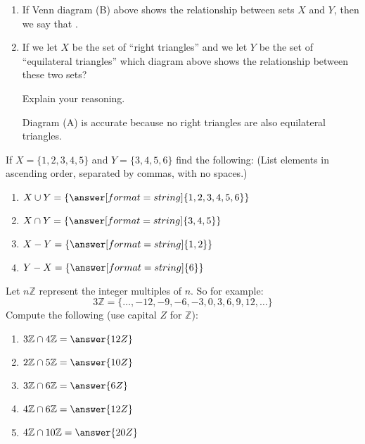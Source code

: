 \documentclass[nooutcomes]{ximera}
\begin{document}
\begin{problem}
\begin{enumerate}
\item If Venn diagram (B) above shows the relationship between sets $X$ and $Y$, then we say that .

\item If we let $X$ be the set of ``right triangles'' and we let $Y$ be the set of ``equilateral triangles'' which diagram above shows the relationship between these two sets?
\begin{multipleChoice}
\end{multipleChoice}

Explain your reasoning.
\begin{freeResponse}
\begin{hint}
Diagram (A) is accurate because no right triangles are also equilateral triangles.  
\end{hint}
\end{freeResponse}
\end{enumerate}
\end{problem}


\begin{problem}
If $X = \{1,2,3,4,5\}$ and $Y = \{3,4,5,6\}$ find the following: (List elements in ascending order, separated by commas, with no spaces.)
\begin{enumerate}
\item $X\cup Y = \{\answer[format=string]{1,2,3,4,5,6}\}$
\item $X\cap Y = \{\answer[format=string]{3,4,5}\}$
\item $X-Y = \{\answer[format=string]{1,2}\}$
\item $Y-X = \{\answer[format=string]{6}\}$
\end{enumerate}
\end{problem}

\begin{problem}
Let $n\mathbb Z$ represent the integer multiples of $n$. So for example:
\[
3\mathbb Z = \{\dots,-12,-9,-6,-3,0,3,6,9,12,\dots\}
\]
Compute the following (use capital $Z$ for $\mathbb Z$):
\begin{enumerate}
\item $3\mathbb Z\cap 4\mathbb Z = \answer{12Z}$ 
\item $2\mathbb Z\cap 5\mathbb Z = \answer{10Z}$
\item $3\mathbb Z\cap 6\mathbb Z = \answer{6Z}$
\item $4\mathbb Z\cap 6\mathbb Z = \answer{12Z}$
\item $4\mathbb Z\cap 10\mathbb Z = \answer{20Z}$
\end{enumerate}
\end{problem}
\end{document}
